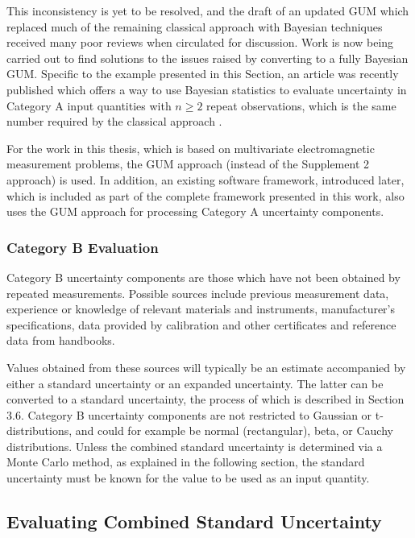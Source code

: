 \documentclass[../thesis/thesis.tex]{subfiles}
\begin{document}
This inconsistency is yet to be resolved, and the draft of an updated GUM which replaced much of the remaining classical approach with Bayesian techniques received many poor reviews when circulated for discussion. Work is now being carried out to find solutions to the issues raised by converting to a fully Bayesian GUM. Specific to the example presented in this Section, an article was recently published which offers a way to use Bayesian statistics to evaluate uncertainty in Category A input quantities with $n \ge 2$ repeat observations, which is the same number required by the classical approach \cite{Cox_2017}.

For the work in this thesis, which is based on multivariate electromagnetic measurement problems, the GUM approach (instead of the Supplement 2 approach) is used. In addition, an existing software framework, introduced later, which is included as part of the complete framework presented in this work, also uses the GUM approach for processing Category A uncertainty components.

\subsubsection{Category B Evaluation}

Category B uncertainty components are those which have not been obtained by repeated measurements. Possible sources include previous measurement data, experience or knowledge of relevant materials and instruments, manufacturer’s specifications, data provided by calibration and other certificates and reference data from handbooks.

Values obtained from these sources will typically be an estimate accompanied by either a standard uncertainty or an expanded uncertainty. The latter can be converted to a standard uncertainty, the process of which is described in Section 3.6. Category B uncertainty components are not restricted to Gaussian or t-distributions, and could for example be normal (rectangular), beta, or Cauchy distributions. Unless the combined standard uncertainty is determined via a Monte Carlo method, as explained in the following section, the standard uncertainty must be known for the value to be used as an input quantity.

\subsection{Evaluating Combined Standard Uncertainty}
\end{document}

